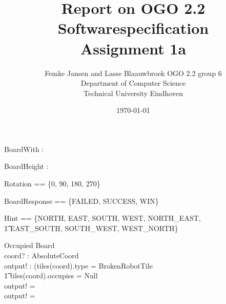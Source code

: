 \documentclass[12pt]{article}
\title{Report on OGO 2.2 Softwarespecification\\ Assignment 1a}
\author{
        Femke Jansen and Lasse Blaauwbroek OGO 2.2 group 6 \\
                Department of Computer Science\\
        Technical University Eindhoven\\
}
\date{\today}
\begin{document}
\maketitle

\begin{abstract}

\end{abstract}

\begin{axdef}
[Null]
\end{axdef}

\begin{axdef}
BoardWith : \nat
\end{axdef}

\begin{axdef}
BoardHeight : \nat
\end{axdef}

\begin{axdef}
Rotation == \{0, 90, 180, 270\}
\end{axdef}

\begin{axdef}
BoardResponse == \{FAILED, SUCCESS, WIN\}
\end{axdef}

\begin{axdef}
Hint == \{NORTH, EAST, SOUTH, WEST, NORTH\_EAST, \\ \t1 EAST\_SOUTH, SOUTH\_WEST, WEST\_NORTH\}
\end{axdef}

\begin{schema}{Occupied}
\Xi Board \\
coord? : AbsoluteCoord \\
output! : \bool
\where
\IF (tiles(coord).type = BrokenRobotTile \; \; \vee \\ \t1
tiles(coord).occupies \not = Null \\
\THEN
output! = \true \\
\ELSE
output! = \false
\end{schema}
\end{document}

